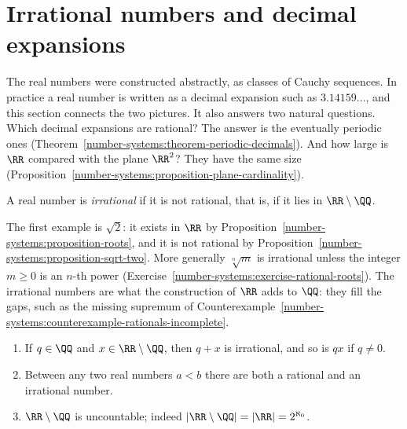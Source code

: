 \section{Irrational numbers and decimal expansions}\label{number-systems:section-decimals}

The real numbers were constructed abstractly, as classes of Cauchy sequences. In practice a real number is written as a decimal expansion such as $3.14159\ldots$, and this section connects the two
pictures. It also answers two natural questions. Which decimal expansions are rational? The answer is the eventually periodic ones (Theorem~\ref{number-systems:theorem-periodic-decimals}). And how large is
$\RR$ compared with the plane $\RR^2$? They have the same size (Proposition~\ref{number-systems:proposition-plane-cardinality}).

\begin{definition}\label{number-systems:definition-irrational}
A real number is \emph{irrational} if it is not rational, that is, if it lies in $\RR \setminus \QQ$.
\end{definition}

The first example is $\sqrt 2$: it exists in $\RR$ by Proposition~\ref{number-systems:proposition-roots}, and it is not rational by Proposition~\ref{number-systems:proposition-sqrt-two}. More generally $\sqrt[n]{m}$ is
irrational unless the integer $m \geq 0$ is an $n$-th power (Exercise~\ref{number-systems:exercise-rational-roots}). The irrational numbers are what the construction of $\RR$ adds to $\QQ$: they fill the gaps,
such as the missing supremum of Counterexample~\ref{number-systems:counterexample-rationals-incomplete}.

\begin{proposition}\label{number-systems:proposition-irrationals}
\begin{enumerate}
\item If $q \in \QQ$ and $x \in \RR \setminus \QQ$, then $q + x$ is irrational, and so is $qx$ if $q \neq 0$.
\item Between any two real numbers $a < b$ there are both a rational and an irrational number.
\item $\RR \setminus \QQ$ is uncountable; indeed $|\RR \setminus \QQ| = |\RR| = 2^{\aleph_0}$.
\end{enumerate}
\end{proposition}

